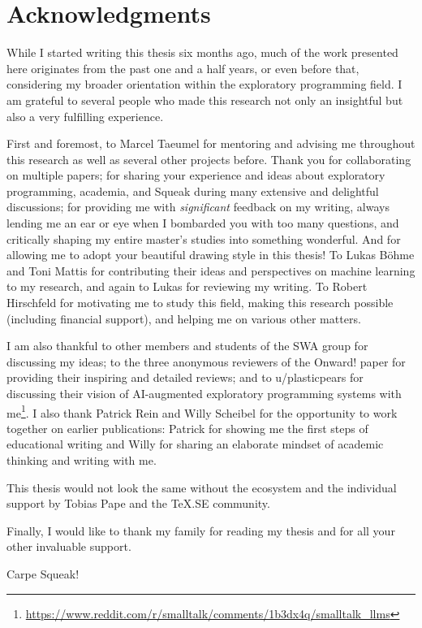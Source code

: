 
\begingroup
\let\raggedsection\centering

\chapter*{Acknowledgments}
\label{cha:acknowledgments}
\endgroup
\begin{quoting}[leftmargin=1.75em,rightmargin=1.75em]
	\noindent
	While I started writing this thesis six months ago, much of the work presented here originates from the past one and a half years, or even before that, considering my broader orientation within the exploratory programming field.
	I am grateful to several people who made this research not only an insightful but also a very fulfilling experience.

	First and foremost, to Marcel Taeumel for mentoring and advising me throughout this research as well as several other projects before. Thank you for collaborating on multiple papers; for sharing your experience and ideas about exploratory programming, academia, and Squeak during many extensive and delightful discussions; for providing me with \emph{significant} feedback on my writing, always lending me an ear or eye when I bombarded you with too many questions, and critically shaping my entire master's studies into something wonderful.
	And for allowing me to adopt your beautiful drawing style in this thesis!
	To Lukas Böhme and Toni Mattis for contributing their ideas and perspectives on machine learning to my research, and again to Lukas for reviewing my writing.
	To Robert Hirschfeld for motivating me to study this field, making this research possible (including financial support), and helping me on various other matters.

	I am also thankful to other members and students of the SWA group for discussing my ideas; to the three anonymous reviewers of the Onward! paper for providing their inspiring and detailed reviews; and to u/plasticpears for discussing their vision of AI-augmented exploratory programming systems with me\footnote{\url{https://www.reddit.com/r/smalltalk/comments/1b3dx4q/smalltalk_llms}}.
	I also thank Patrick Rein and Willy Scheibel for the opportunity to work together on earlier publications: Patrick for showing me the first steps of educational writing and Willy for sharing an elaborate mindset of academic thinking and writing with me.

	This thesis would not look the same without the ecosystem and the individual support by Tobias Pape and the \TeX.SE community.

	Finally, I would like to thank my family for reading my thesis and for all your other invaluable support.

	\bigskip

	Carpe Squeak!
\end{quoting}

